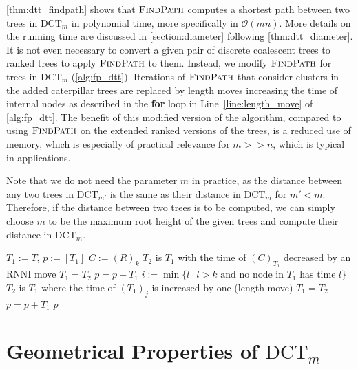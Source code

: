 \documentclass[11pt]{amsart}
\newcommand{\rnni}{\mathrm{RNNI}}
\newcommand{\findpath}{\textsc{FindPath}}
\newcommand{\ntime}{\mathrm{time}}
\newcommand{\dtt}{\mathrm{DCT}}
\renewcommand{\O}{\mathcal O}
\newcommand{\summary}[1]{} %
\begin{document}
\summary{Running time of $\findpath$ + we don't need to add subtree in practice}
\autoref{thm:dtt_findpath} shows that $\findpath$ computes a shortest path between two trees in $\dtt_m$ in polynomial time, more specifically in $\O(mn)$.
More details on the running time are discussed in \autoref{section:diameter} following \autoref{thm:dtt_diameter}.
It is not even necessary to convert a given pair of discrete coalescent trees to ranked trees to apply $\findpath$ to them.
Instead, we modify $\findpath$ for trees in $\dtt_m$ (\autoref{alg:fp_dtt}).
Iterations of $\findpath$ that consider clusters in the added caterpillar trees are replaced by length moves increasing the time of internal nodes as described in the \textbf{for} loop in Line~\ref{line:length_move} of \autoref{alg:fp_dtt}.
The benefit of this modified version of the algorithm, compared to using $\findpath$ on the extended ranked versions of the trees, is a reduced use of memory, which is especially of practical relevance for $m >> n$, which is typical in applications.

Note that we do not need the parameter $m$ in practice, as the distance between any two trees in $\dtt_{m'}$ is the same as their distance in $\dtt_m$ for $m' < m$.
Therefore, if the distance between two trees is to be computed, we can simply choose $m$ to be the maximum root height of the given trees and compute their distance in $\dtt_m$.

\begin{algorithm}[h]
	\caption{$\findpath$($T,R$)}
	\begin{algorithmic}[1]
		\label{alg:fp_dtt}
		\STATE $T_1 := T$, $p := [T_1]$
			\STATE $C:=(R)_k$
			\WHILE {$\ntime((C)_{T_1})>k$}
					\STATE $T_2$ is $T_1$ with the time of $(C)_{T_1}$ decreased by an $\rnni$ move
				\STATE $T_1 = T_2$
				\STATE $p = p+T_1$
			\ENDWHILE
				\STATE $i := \min\{l \ |\  l>k \text{ and no node in } T_1 \text{ has time }l\}$
					\label{line:length_move}
					\STATE $T_2$ is $T_1$ where the time of $(T_1)_j$ is increased by one (length move)
					\STATE $T_1 = T_2$
					\STATE $p = p+T_1$
				\ENDFOR
			\ENDIF
		\ENDFOR
		\RETURN $p$
	\end{algorithmic}
\end{algorithm}


\section{Geometrical Properties of $\dtt_m$}
\label{section:geometry}
\end{document}
